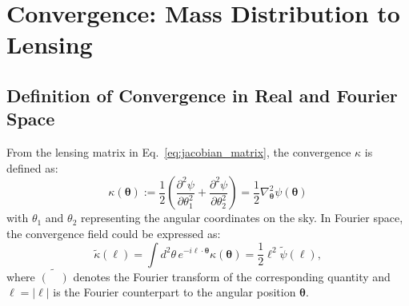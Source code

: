\section[Convergence Field]{Convergence: Mass Distribution to Lensing} \label{sec:convergence}
\subsection{Definition of Convergence in Real and Fourier Space}
From the lensing matrix in Eq.~\eqref{eq:jacobian_matrix}, the convergence $\kappa$ is defined as:
\begin{equation}
    \label{eq:convergence}
        \kappa(\boldsymbol{\theta}) := \frac{1}{2} \left( \frac{\partial^2 \psi}{\partial \theta_1^2} + \frac{\partial^2 \psi}{\partial \theta_2^2} \right) = \frac{1}{2} \nabla_{\boldsymbol{\theta}}^2 \psi(\boldsymbol{\theta})
\end{equation}
with $\theta_1$ and $\theta_2$ representing the angular coordinates on the sky.
In Fourier space, the convergence field could be expressed as:
\begin{equation}
    \label{eq:fourier_convergence}
    \tilde{\kappa}(\boldsymbol{\ell}) = \int d^2\theta \, e^{-i\boldsymbol{\ell} \cdot \boldsymbol{\theta}} \kappa(\boldsymbol{\theta}) = \frac{1}{2} \ell^2 \tilde{\psi}(\boldsymbol{\ell}),
\end{equation}
where $\tilde{(\quad)}$ denotes the Fourier transform of the corresponding quantity and $\ell = |\boldsymbol{\ell}|$ is the Fourier counterpart to the angular position $\boldsymbol{\theta}$.


